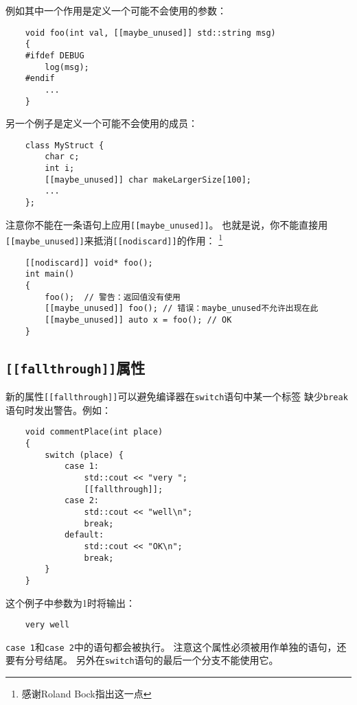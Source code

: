例如其中一个作用是定义一个可能不会使用的参数：
\begin{lstlisting}
    void foo(int val, [[maybe_unused]] std::string msg)
    {
    #ifdef DEBUG
        log(msg);
    #endif
        ...
    }
\end{lstlisting}
另一个例子是定义一个可能不会使用的成员：
\begin{lstlisting}
    class MyStruct {
        char c;
        int i;
        [[maybe_unused]] char makeLargerSize[100];
        ...
    };
\end{lstlisting}
注意你不能在一条语句上应用\texttt{[[maybe\_unused]]}。
也就是说，你不能直接用\texttt{[[maybe\_unused]]}来抵消\texttt{[[nodiscard]]}的作用：
\footnote{感谢Roland Bock指出这一点}
\begin{lstlisting}
    [[nodiscard]] void* foo();
    int main()
    {
        foo();  // 警告：返回值没有使用
        [[maybe_unused]] foo(); // 错误：maybe_unused不允许出现在此
        [[maybe_unused]] auto x = foo(); // OK
    }
\end{lstlisting}

\subsection{\texttt{[[fallthrough]]}属性}
新的属性\texttt{[[fallthrough]]}可以避免编译器在\texttt{switch}语句中某一个标签
缺少\texttt{break}语句时发出警告。例如：
\begin{lstlisting}
    void commentPlace(int place)
    {
        switch (place) {
            case 1:
                std::cout << "very ";
                [[fallthrough]];
            case 2:
                std::cout << "well\n";
                break;
            default:
                std::cout << "OK\n";
                break;
        }
    }
\end{lstlisting}
这个例子中参数为1时将输出：
\begin{lstlisting}
    very well
\end{lstlisting}
\texttt{case 1}和\texttt{case 2}中的语句都会被执行。
注意这个属性必须被用作单独的语句，还要有分号结尾。
另外在\texttt{switch}语句的最后一个分支不能使用它。

